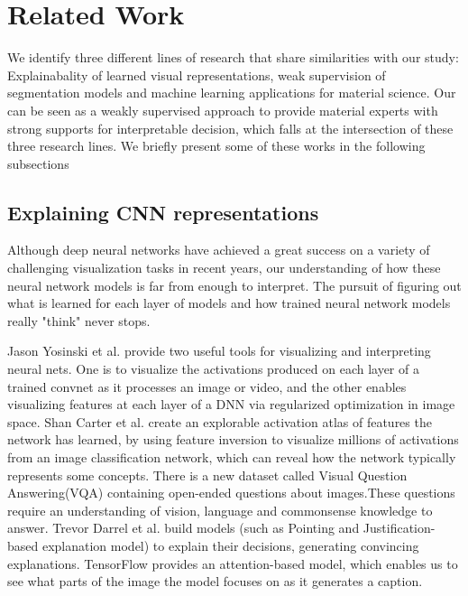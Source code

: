 \documentclass[10pt,twocolumn,letterpaper]{article}
\begin{document}
\section{Related Work}

We identify three different lines of research that share similarities with our study:
Explainabality of learned visual representations, 
weak supervision of segmentation models and 
machine learning applications for material science.
Our can be seen as a weakly supervised approach to provide material 
experts with strong supports for interpretable decision, 
which falls at the intersection of these three research lines.
We briefly present some of these works in the following subsections

\subsection{Explaining CNN representations}
Although deep neural networks have achieved a great success on a variety 
of challenging visualization tasks in recent years, 
our understanding of how these neural network models is far from enough to interpret.
The pursuit of figuring out what is learned for each layer of models 
and how trained neural network models really "think" never stops.

Jason Yosinski et al. provide two useful tools for visualizing and interpreting neural nets. 
One is to visualize  the activations produced on each layer of a trained convnet as it 
processes an image or video, and the other enables visualizing 
features at each layer of a DNN via regularized optimization in image space.
Shan Carter et al. create an explorable activation atlas of features the network has learned, by using feature inversion to visualize millions of activations from an image classification network, which can reveal how the network typically represents some concepts.
There is a new dataset called Visual Question Answering(VQA) containing open-ended questions about images.These questions require an understanding of vision, language and commonsense knowledge to answer.
Trevor Darrel et al. build  models (such as Pointing and Justification-based explanation model) to explain their decisions, generating convincing explanations.
TensorFlow provides an attention-based model, which enables us to see what parts of the image the model focuses on as it generates a caption.
\end{document}
